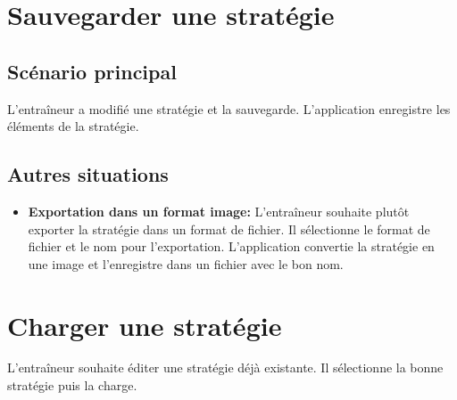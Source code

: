 \section{Sauvegarder une stratégie}
\label{sec:exporter_une_strategie}

\subsection{Sc\'enario principal}
\label{sub:sc'enario_principal}

L'entra\^ineur a modifié une strat\'egie et la sauvegarde.
L'application enregistre les \'el\'ements de la strat\'egie.

\subsection{Autres situations}
\label{sub:autres_situations}

\begin{itemize}
    \item \textbf{Exportation dans un format image:} L'entra\^ineur souhaite plut\^ot exporter la strat\'egie dans un format de fichier.
        Il s\'electionne le format de fichier et le nom pour l'exportation.
        L'application convertie la strat\'egie en une image et l'enregistre dans un fichier avec le bon nom.
\end{itemize}



\section{Charger une strat\'egie}
\label{sec:charger_une_strat'egie}

L'entra\^ineur souhaite \'editer une strat\'egie d\'ej\`a existante.
Il s\'electionne la bonne strat\'egie puis la charge.
